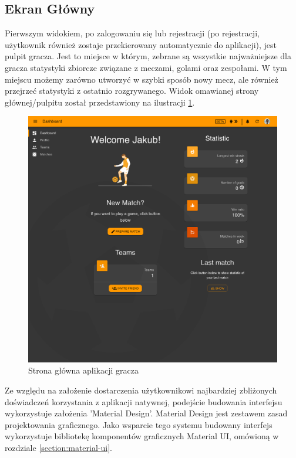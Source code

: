 \subsection{Ekran Główny}

Pierwszym widokiem, po zalogowaniu się lub rejestracji (po rejestracji, użytkownik również zostaje przekierowany automatycznie do aplikacji), jest pulpit gracza. Jest to miejsce w którym, zebrane są wszystkie najważniejsze dla gracza statystyki zbiorcze związane z meczami, golami oraz zespołami. W tym miejscu możemy zarówno utworzyć w szybki sposób nowy mecz, ale również przejrzeć statystyki z ostatnio rozgrywanego. Widok omawianej strony głównej/pulpitu został przedstawiony na ilustracji \ref{fig:dashboard}.

\begin{figure}[h!]
  \centering
    \includegraphics[width=\textwidth]{images/player/dashboard.png}
  \caption{Strona główna aplikacji gracza}
  \label{fig:dashboard}
\end{figure}

Ze względu na założenie dostarczenia użytkownikowi najbardziej zbliżonych doświadczeń korzystania z aplikacji natywnej, podejście budowania interfejsu wykorzystuje założenia 'Material Design'. Material Design jest zestawem zasad projektowania graficznego. Jako wsparcie tego systemu budowany interfejs wykorzystuje bibliotekę komponentów graficznych Material UI, omówioną w rozdziale \ref{section:material-ui}.

